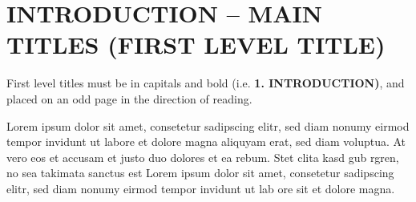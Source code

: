 \chapter{INTRODUCTION -- MAIN TITLES (FIRST LEVEL TITLE)}\label{Ch1}
First level titles must be in capitals and bold (i.e. \textbf{1. INTRODUCTION)}, and placed on an odd page in the direction of reading.

Lorem ipsum dolor sit amet, consetetur sadipscing elitr, sed diam nonumy eirmod tempor invidunt ut labore et dolore magna aliquyam erat, sed diam voluptua. At vero eos et accusam et justo duo dolores et ea rebum. Stet clita kasd gub rgren, no sea takimata sanctus est  Lorem ipsum dolor sit amet, consetetur sadipscing elitr,  sed diam nonumy eirmod tempor invidunt ut lab  ore sit et dolore magna.






